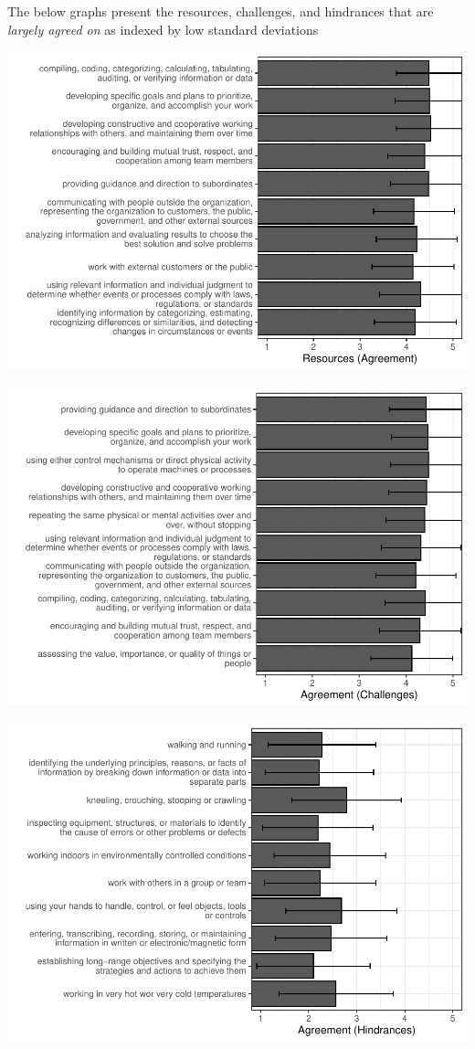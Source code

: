 \documentclass[
  english,
  man]{apa6}
\begin{document}
The below graphs present the resources, challenges, and hindrances that are \emph{largely agreed on} as indexed by low standard deviations

\includegraphics{SIOPjdr2_files/figure-latex/resourceslowsd-1.pdf}

\includegraphics{SIOPjdr2_files/figure-latex/challengesagree-1.pdf}

\includegraphics{SIOPjdr2_files/figure-latex/hindrancesagree-1.pdf}
\end{document}
